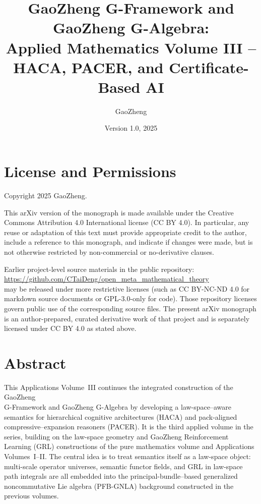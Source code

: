 \documentclass[11pt]{book}
\title{\textbf{GaoZheng G-Framework and GaoZheng G-Algebra:\\
Applied Mathematics Volume III -- HACA, PACER, and Certificate-Based AI}}
\author{GaoZheng}
\date{Version 1.0, 2025}
\theoremstyle{plain}
\theoremstyle{definition}
\theoremstyle{remark}
\begin{document}
\raggedbottom 

\maketitle

\frontmatter



\chapter*{License and Permissions}


Copyright \textcopyright{} 2025 GaoZheng.

This arXiv version of the monograph is made available under the
Creative Commons Attribution 4.0 International license (CC BY 4.0).
In particular, any reuse or adaptation of this text must provide
appropriate credit to the author, include a reference to this
monograph, and indicate if changes were made, but is not otherwise
restricted by non-commercial or no-derivative clauses.

Earlier project-level source materials in the public repository: \\
\url{https://github.com/CTaiDeng/open_meta_mathematical_theory} \\
may be released under more restrictive licenses (such as
CC BY-NC-ND 4.0 for markdown source documents or GPL-3.0-only for
code). Those repository licenses govern public use of the
corresponding source files. The present arXiv monograph is an
author-prepared, curated derivative work of that project and is
separately licensed under CC BY 4.0 as stated above.


\chapter*{Abstract}
This Applications Volume~III continues the integrated construction of the
GaoZheng \\G-Framework and GaoZheng G-Algebra by developing a law-space–aware
semantics for hierarchical cognitive architectures (HACA) and pack-aligned
compressive–expansion reasoners (PACER). It is the third applied volume in the
series, building on the law-space geometry and GaoZheng Reinforcement Learning
(GRL) constructions of the pure mathematics volume and Applications Volumes~I–II.
The central idea is to treat semantics itself as a law-space object:
multi-scale operator universes, semantic functor fields, and GRL in law-space
path integrals are all embedded into the principal-bundle–based generalized
noncommutative Lie algebra (PFB-GNLA) background constructed in the previous
volumes.
\end{document}
